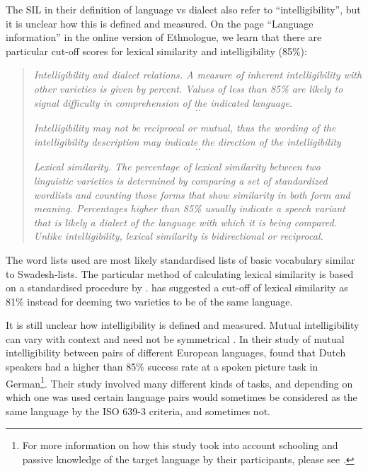 \documentclass[12pt,letterpaper]{article}
\begin{document}
The SIL in their definition of language vs dialect also refer to ``intelligibility'', but it is unclear how this is defined and measured. On the page ``Language information'' in the online version of Ethnologue, we learn that there are particular cut-off scores for lexical similarity and intelligibility (85\%):


\begin{quotation}
\noindent\emph{Intelligibility and dialect relations. A measure of inherent intelligibility with other varieties is given by percent. Values of less than 85\% are likely to signal difficulty in comprehension of the indicated language.} \[..\]  

\noindent\emph{Intelligibility may not be reciprocal or mutual, thus the wording of the intelligibility description may indicate the direction of the intelligibility}\[..\]

\noindent\emph{Lexical similarity. The percentage of lexical similarity between two linguistic varieties is determined by comparing a set of standardized wordlists and counting those forms that show similarity in both form and meaning. Percentages higher than 85\% usually indicate a speech variant that is likely a dialect of the language with which it is being compared. Unlike intelligibility, lexical similarity is bidirectional or reciprocal.} 
\begin{flushright}\citet{ethnologue2019lgident}\end{flushright}
\end{quotation}

The word lists used are most likely standardised lists of basic vocabulary similar to Swadesh-lists. The particular method of calculating lexical similarity is based on a standardised procedure by \citet{rensch1992calculating}. \citet[326]{swadesh1954perspectives} has suggested a cut-off of lexical similarity as 81\% instead for deeming two varieties to be of the same language. 

It is still unclear how intelligibility is defined and measured. Mutual intelligibility can vary with context and need not be symmetrical \citep[356]{NETTLE1998}. In their study of mutual intelligibility between pairs of different European languages, \citet{gooskens2017measuring} found that Dutch speakers had a higher than 85\% success rate at a spoken picture task in German\footnote{For more information on how this study took into account schooling and passive knowledge of the target language by their participants, please see \citet{gooskens2017measuring}.}. Their study involved many different kinds of tasks, and depending on which one was used certain language pairs would sometimes be considered as the same language by the ISO 639-3 criteria, and sometimes not.
\end{document}
